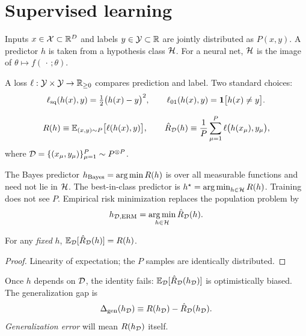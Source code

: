 \section{Supervised learning}
\label{sec:supervised}

Inputs $x\in\mathcal{X}\subset\mathbb{R}^{D}$ and labels $y\in\mathcal{Y}\subset\mathbb{R}$ are jointly distributed as $P(x,y)$. A predictor $h$ is taken from a hypothesis class $\mathcal{H}$. For a neural net, $\mathcal{H}$ is the image of $\theta\mapsto f(\,\cdot\,;\theta)$.

A loss $\ell:\mathcal{Y}\times\mathcal{Y}\to\mathbb{R}_{\ge 0}$ compares prediction and label. Two standard choices:
\begin{equation}
  \ell_{\mathrm{sq}}(h(x),y)=\tfrac12\bigl(h(x)-y\bigr)^2,
  \qquad
  \ell_{01}(h(x),y)=\mathbf{1}\bigl[h(x)\neq y\bigr].
  \label{eq:losses}
\end{equation}

\begin{definition}
\begin{equation}
  R(h)\equiv \mathbb{E}_{(x,y)\sim P}\bigl[\ell(h(x),y)\bigr],
  \qquad
  \hat R_{\mathcal{D}}(h)\equiv\frac1P\sum_{\mu=1}^{P}\ell\bigl(h(x_\mu),y_\mu\bigr),
  \label{eq:risks}
\end{equation}
where $\mathcal{D}=\{(x_\mu,y_\mu)\}_{\mu=1}^{P}\sim P^{\otimes P}$.
\end{definition}

The Bayes predictor $h_{\mathrm{Bayes}}=\operatorname*{arg\,min} R(h)$ is over all measurable functions and need not lie in $\mathcal{H}$. The best-in-class predictor is $h^\star=\operatorname*{arg\,min}_{h\in\mathcal{H}} R(h)$. Training does not see $P$. Empirical risk minimization replaces the population problem by
\begin{equation}
  h_{\mathcal{D},\mathrm{ERM}}=\operatorname*{arg\,min}_{h\in\mathcal{H}}\hat R_{\mathcal{D}}(h).
  \label{eq:erm}
\end{equation}

\begin{lemma}
For any \emph{fixed} $h$, $\mathbb{E}_{\mathcal{D}}[\hat R_{\mathcal{D}}(h)]=R(h)$.
\end{lemma}
\begin{proof}
Linearity of expectation; the $P$ samples are identically distributed.
\end{proof}
Once $h$ depends on $\mathcal{D}$, the identity fails: $\mathbb{E}_{\mathcal{D}}[\hat R_{\mathcal{D}}(h_{\mathcal{D}})]$ is optimistically biased. The generalization gap is
\begin{equation}
  \Delta_{\mathrm{gen}}(h_{\mathcal{D}})\equiv R(h_{\mathcal{D}})-\hat R_{\mathcal{D}}(h_{\mathcal{D}}).
  \label{eq:gen-gap}
\end{equation}
\emph{Generalization error} will mean $R(h_{\mathcal{D}})$ itself.

